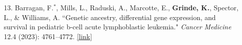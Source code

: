 \documentclass[margin]{res}
\begin{document}
\begin{resume}
\begin{itemize}
\item[13.] Barragan, F.$^*$, Mills, L., Raduski, A., Marcotte, E., \textbf{Grinde, K.}, Spector, L., \& Williams, A. ``Genetic ancestry, differential gene expression, and survival in pediatric b-cell acute lymphoblastic leukemia." \textit{Cancer Medicine} 12.4 (2023): 4761--4772.
\href{https://onlinelibrary.wiley.com/doi/full/10.1002/cam4.5266}{[link]}



\end{itemize}
\end{resume}
\end{document}
